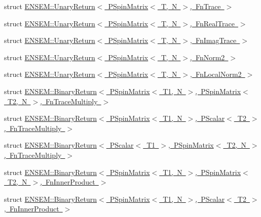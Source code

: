 \begin{DoxyCompactItemize}
\item 
struct \mbox{\hyperlink{structENSEM_1_1UnaryReturn_3_01PSpinMatrix_3_01T_00_01N_01_4_00_01FnTrace_01_4}{E\+N\+S\+E\+M\+::\+Unary\+Return$<$ P\+Spin\+Matrix$<$ T, N $>$, Fn\+Trace $>$}}
\item 
struct \mbox{\hyperlink{structENSEM_1_1UnaryReturn_3_01PSpinMatrix_3_01T_00_01N_01_4_00_01FnRealTrace_01_4}{E\+N\+S\+E\+M\+::\+Unary\+Return$<$ P\+Spin\+Matrix$<$ T, N $>$, Fn\+Real\+Trace $>$}}
\item 
struct \mbox{\hyperlink{structENSEM_1_1UnaryReturn_3_01PSpinMatrix_3_01T_00_01N_01_4_00_01FnImagTrace_01_4}{E\+N\+S\+E\+M\+::\+Unary\+Return$<$ P\+Spin\+Matrix$<$ T, N $>$, Fn\+Imag\+Trace $>$}}
\item 
struct \mbox{\hyperlink{structENSEM_1_1UnaryReturn_3_01PSpinMatrix_3_01T_00_01N_01_4_00_01FnNorm2_01_4}{E\+N\+S\+E\+M\+::\+Unary\+Return$<$ P\+Spin\+Matrix$<$ T, N $>$, Fn\+Norm2 $>$}}
\item 
struct \mbox{\hyperlink{structENSEM_1_1UnaryReturn_3_01PSpinMatrix_3_01T_00_01N_01_4_00_01FnLocalNorm2_01_4}{E\+N\+S\+E\+M\+::\+Unary\+Return$<$ P\+Spin\+Matrix$<$ T, N $>$, Fn\+Local\+Norm2 $>$}}
\item 
struct \mbox{\hyperlink{structENSEM_1_1BinaryReturn_3_01PSpinMatrix_3_01T1_00_01N_01_4_00_01PSpinMatrix_3_01T2_00_01N_01_4_00_01FnTraceMultiply_01_4}{E\+N\+S\+E\+M\+::\+Binary\+Return$<$ P\+Spin\+Matrix$<$ T1, N $>$, P\+Spin\+Matrix$<$ T2, N $>$, Fn\+Trace\+Multiply $>$}}
\item 
struct \mbox{\hyperlink{structENSEM_1_1BinaryReturn_3_01PSpinMatrix_3_01T1_00_01N_01_4_00_01PScalar_3_01T2_01_4_00_01FnTraceMultiply_01_4}{E\+N\+S\+E\+M\+::\+Binary\+Return$<$ P\+Spin\+Matrix$<$ T1, N $>$, P\+Scalar$<$ T2 $>$, Fn\+Trace\+Multiply $>$}}
\item 
struct \mbox{\hyperlink{structENSEM_1_1BinaryReturn_3_01PScalar_3_01T1_01_4_00_01PSpinMatrix_3_01T2_00_01N_01_4_00_01FnTraceMultiply_01_4}{E\+N\+S\+E\+M\+::\+Binary\+Return$<$ P\+Scalar$<$ T1 $>$, P\+Spin\+Matrix$<$ T2, N $>$, Fn\+Trace\+Multiply $>$}}
\item 
struct \mbox{\hyperlink{structENSEM_1_1BinaryReturn_3_01PSpinMatrix_3_01T1_00_01N_01_4_00_01PSpinMatrix_3_01T2_00_01N_01_4_00_01FnInnerProduct_01_4}{E\+N\+S\+E\+M\+::\+Binary\+Return$<$ P\+Spin\+Matrix$<$ T1, N $>$, P\+Spin\+Matrix$<$ T2, N $>$, Fn\+Inner\+Product $>$}}
\item 
struct \mbox{\hyperlink{structENSEM_1_1BinaryReturn_3_01PSpinMatrix_3_01T1_00_01N_01_4_00_01PScalar_3_01T2_01_4_00_01FnInnerProduct_01_4}{E\+N\+S\+E\+M\+::\+Binary\+Return$<$ P\+Spin\+Matrix$<$ T1, N $>$, P\+Scalar$<$ T2 $>$, Fn\+Inner\+Product $>$}}

\end{DoxyCompactItemize}
